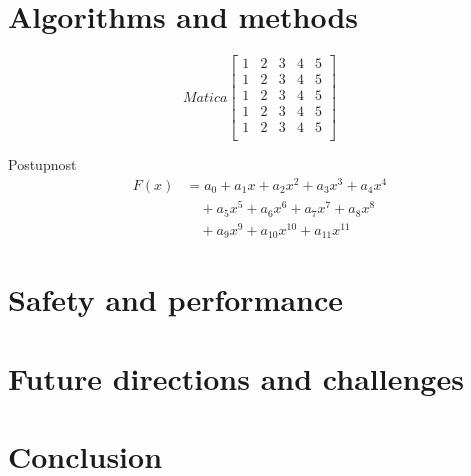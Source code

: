 \documentclass[10pt,oneside,english,a4paper]{article}
\begin{document}
\section{Algorithms and methods} \label{dolezita}



\[Matica
\begin{bmatrix}
1 & 2 & 3 & 4 & 5\\
1 & 2 & 3 & 4 & 5\\
1 & 2 & 3 & 4 & 5\\
1 & 2 & 3 & 4 & 5\\
1 & 2 & 3 & 4 & 5\\
\end{bmatrix}
\]

Postupnost
\begin{align}
    F(x) &= a_0 + a_1 x + a_2 x^2 + a_3 x^3 + a_4 x^4 \nonumber \\
         &\quad + a_5 x^5 + a_6 x^6 + a_7 x^7 + a_8 x^8 \nonumber \\
         &\quad + a_9 x^9 + a_{10} x^{10} + a_{11} x^{11} \nonumber
\end{align}

\section{Safety and performance} \label{dolezitejsia}




\section{Future directions and challenges} \label{dolezitejsia}




\section{Conclusion} \label{zaver} %






\end{document}
